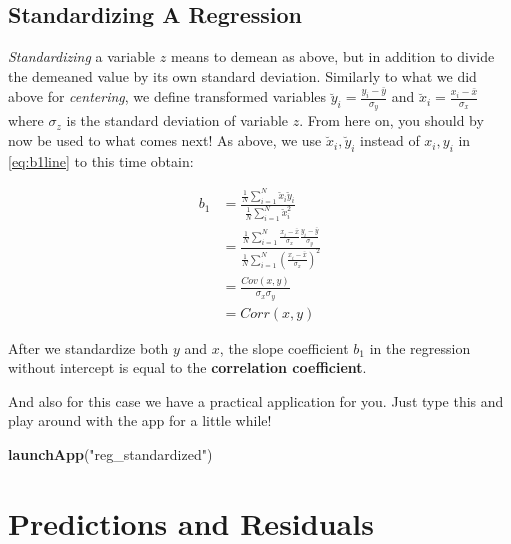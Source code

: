 \documentclass[]{book}
\newenvironment{Shaded}{\begin{snugshade}}{\end{snugshade}}
\newcommand{\KeywordTok}[1]{\textcolor[rgb]{0.13,0.29,0.53}{\textbf{#1}}}
\newcommand{\NormalTok}[1]{#1}
\newcommand{\StringTok}[1]{\textcolor[rgb]{0.31,0.60,0.02}{#1}}
\newenvironment{tip}{\begin{tcolorbox}[colback=green!5!white,colframe=green]}{\end{tcolorbox}}
\begin{document}
\hypertarget{reg-standard}{%
\subsection{Standardizing A Regression}\label{reg-standard}}

\emph{Standardizing} a variable \(z\) means to demean as above, but in addition to divide the demeaned value by its own standard deviation. Similarly to what we did above for \emph{centering}, we define transformed variables \(\breve{y}_i = \frac{y_i-\bar{y}}{\sigma_y}\) and \(\breve{x}_i = \frac{x_i-\bar{x}}{\sigma_x}\) where \(\sigma_z\) is the standard deviation of variable \(z\). From here on, you should by now be used to what comes next! As above, we use \(\breve{x}_i,\breve{y}_i\) instead of \(x_i,y_i\) in \eqref{eq:b1line} to this time obtain:

\begin{align}
b_1 &= \frac{\frac{1}{N}\sum_{i=1}^N \breve{x}_i \breve{y}_i}{\frac{1}{N}\sum_{i=1}^N \breve{x}_i^2}\\
    &= \frac{\frac{1}{N}\sum_{i=1}^N \frac{x_i - \bar{x}}{\sigma_x} \frac{y_i - \bar{y}}{\sigma_y}}{\frac{1}{N}\sum_{i=1}^N \left(\frac{x_i - \bar{x}}{\sigma_x}\right)^2} \\
    &= \frac{Cov(x,y)}{\sigma_x \sigma_y} \\
    &= Corr(x,y)  \label{eq:bline-standardized}
\end{align}

\begin{tip}
After we standardize both \(y\) and \(x\), the slope coefficient \(b_1\)
in the regression without intercept is equal to the \textbf{correlation
coefficient}.
\end{tip}

And also for this case we have a practical application for you. Just type this and play around with the app for a little while!

\begin{Shaded}
\begin{Highlighting}[]
\KeywordTok{launchApp}\NormalTok{(}\StringTok{"reg_standardized"}\NormalTok{)}
\end{Highlighting}
\end{Shaded}

\hypertarget{pred-resids}{%
\section{Predictions and Residuals}\label{pred-resids}}
\end{document}
